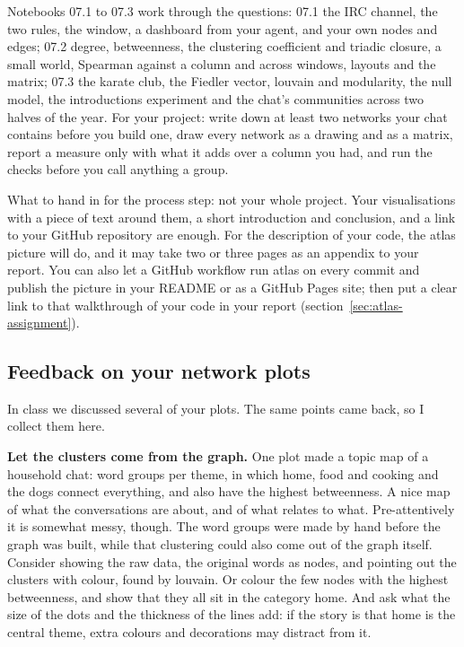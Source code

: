 \documentclass[12pt, a4paper]{article}
\theoremstyle{definition}
\theoremstyle{remark}
\begin{document}
Notebooks 07.1 to 07.3 work through the questions: 07.1 the IRC channel, the two rules, the window, a dashboard from your agent, and your own nodes and edges; 07.2 degree, betweenness, the clustering coefficient and triadic closure, a small world, Spearman against a column and across windows, layouts and the matrix; 07.3 the karate club, the Fiedler vector, louvain and modularity, the null model, the introductions experiment and the chat's communities across two halves of the year. For your project: write down at least two networks your chat contains before you build one, draw every network as a drawing and as a matrix, report a measure only with what it adds over a column you had, and run the checks before you call anything a group.

What to hand in for the process step: not your whole project. Your visualisations with a piece of text around them, a short introduction and conclusion, and a link to your GitHub repository are enough. For the description of your code, the atlas picture will do, and it may take two or three pages as an appendix to your report. You can also let a GitHub workflow run atlas on every commit and publish the picture in your README or as a GitHub Pages site; then put a clear link to that walkthrough of your code in your report (section~\ref{sec:atlas-assignment}).

\subsection{Feedback on your network plots}
\label{sec:lesson7-feedback}
In class we discussed several of your plots. The same points came back, so I collect them here.

\textbf{Let the clusters come from the graph.} One plot made a topic map of a household chat: word groups per theme, in which home, food and cooking and the dogs connect everything, and also have the highest betweenness. A nice map of what the conversations are about, and of what relates to what. Pre-attentively it is somewhat messy, though. The word groups were made by hand before the graph was built, while that clustering could also come out of the graph itself. Consider showing the raw data, the original words as nodes, and pointing out the clusters with colour, found by louvain. Or colour the few nodes with the highest betweenness, and show that they all sit in the category home. And ask what the size of the dots and the thickness of the lines add: if the story is that home is the central theme, extra colours and decorations may distract from it.
\end{document}
